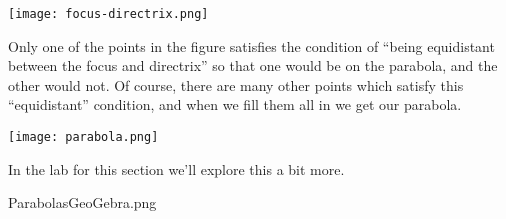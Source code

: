 \centerline{\texttt{[image: focus-directrix.png]}}

Only one of the points in the figure satisfies the condition of ``being equidistant between the focus and directrix'' so that one would be on the parabola, and the other would not.  Of course, there are many other points which satisfy this ``equidistant'' condition, and when we fill them all in we get our parabola.

\centerline{\texttt{[image: parabola.png]}}

In the lab for this section we'll explore this a bit more.

\clearpage
 \begin{worksheet}{16}{Parabolas}{GeoGebra.png}
 
 \end{worksheet}
 \clearpage